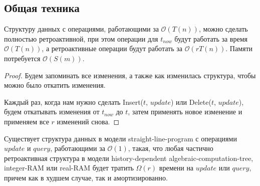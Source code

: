 \subsection*{Общая техника}

\begin{theorem} 

Структуру данных с операциями, работающими за $\mathcal{O}(T(n))$, можно сделать полностью ретроактивной, при этом операции для $t_{now}$ будут работать за время
$\mathcal{O}(T(n))$, а ретроактивные операции будут работать за $\mathcal{O}(rT(n))$. Памяти потребуется $\mathcal{O}(S(m))$.

\end{theorem}

\begin{proof} 

Будем запоминать все изменения, а также как изменилась структура, чтобы можно было откатить изменения.

\vspace{10pt}


Каждый раз, когда нам нужно сделать Insert($t$, $update$) или Delete($t$, $update$), будем откатывать изменения от $t_{now}$ до $t$, затем применять новое изменение и применяем все $r$ изменений снова.
\end{proof}


\begin{theorem} 

Существует структура данных в модели straight-line-program с операциями $update$ и $query$, работающими за $\mathcal{O}(1)$, такая, что любая частично ретроактивная структура в модели history-dependent algebraic-computation-tree, integer-RAM или real-RAM будет тратить $\Omega(r)$ времени на $update$ или $query$, причем как в худшем случае, так и амортизированно.

\end{theorem}

